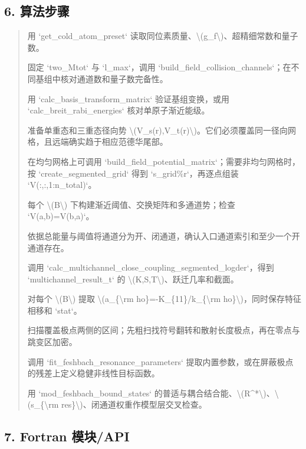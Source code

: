 \documentclass[UTF8,openany,11pt,fontset=fandol]{ctexbook}
\begin{document}
\subsection{\texorpdfstring{\textbf{6.
算法步骤}}{6. 算法步骤}}\label{ux7b97ux6cd5ux6b65ux9aa4-2}

\begin{quote}
用 `get\_cold\_atom\_preset`
读取同位素质量、\textbackslash(g\_f\textbackslash)、超精细常数和量子数。

固定 `two\_Mtot` 与 `l\_max`，调用
`build\_field\_collision\_channels`；在不同基组中核对通道数和量子数完备性。

用 `calc\_basis\_transform\_matrix` 验证基组变换，或用
`calc\_breit\_rabi\_energies` 核对单原子渐近能级。

准备单重态和三重态径向势
\textbackslash(V\_s(r),V\_t(r)\textbackslash)。它们必须覆盖同一径向网格，且远端确实趋于相应范德华尾部。

在均匀网格上可调用
`build\_field\_potential\_matrix`；需要非均匀网格时，按
`create\_segmented\_grid` 得到 `s\_grid\%r`，再逐点组装
`V(:,:,1:n\_total)`。

每个 \textbackslash(B\textbackslash)
下构建渐近阈值、交换矩阵和多通道势；检查 `V(a,b)=V(b,a)`。

依据总能量与阈值将通道分为开、闭通道，确认入口通道索引和至少一个开通道存在。

调用 `calc\_multichannel\_close\_coupling\_segmented\_logder`，得到
`multichannel\_result\_t` 的
\textbackslash(K,S,T\textbackslash)、跃迁几率和截面。

对每个 \textbackslash(B\textbackslash) 提取
\textbackslash(a\_\{\textbackslash rm
ho\}=-K\_\{11\}/k\_\{\textbackslash rm
ho\}\textbackslash)，同时保存特征相移和 `stat`。

扫描覆盖极点两侧的区间；先粗扫找符号翻转和散射长度极点，再在零点与跳变区加密。

调用 `fit\_feshbach\_resonance\_parameters`
提取内置参数，或在屏蔽极点的残差上定义稳健非线性目标函数。

用 `mod\_feshbach\_bound\_states`
的普适与耦合结合能、\textbackslash(R\^{}*\textbackslash)、\textbackslash(s\_\{\textbackslash rm
res\}\textbackslash)、闭通道权重作模型层交叉检查。
\end{quote}

\subsection{\texorpdfstring{\textbf{7. Fortran
模块/API}}{7. Fortran 模块/API}}\label{fortran-ux6a21ux5757api-2}
\end{document}
